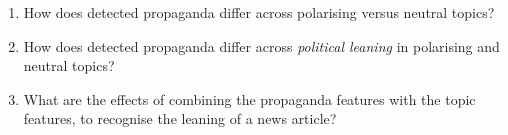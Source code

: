 \begin{enumerate}[label={\textbf{RQ4.\arabic*:}},leftmargin=2cm]
    \item How does detected propaganda differ across polarising versus neutral topics?
    \item How does detected propaganda differ across \emph{political leaning} in polarising and neutral topics?
    \item What are the effects of combining the propaganda features with the topic features, to recognise the leaning of a news article?
\end{enumerate}






